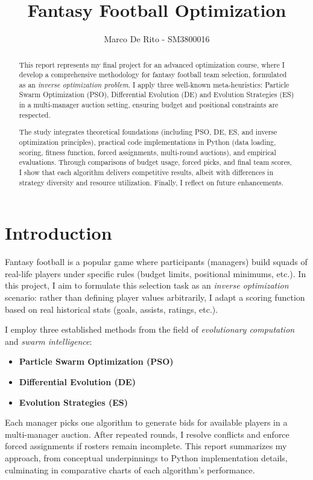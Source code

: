 \documentclass[sigconf]{acmart}
\title{Fantasy Football Optimization}
\author{Marco De Rito - SM3800016}
\affiliation{
	\institution{University of Trieste}
	\city{Trieste}
	\country{Italy}
}
\begin{document}
\sloppy
	\begin{abstract}
This report represents my final project for an advanced optimization course, where I develop a comprehensive methodology for fantasy football team selection, formulated as an \emph{inverse optimization problem}. I apply three well-known meta-heuristics: Particle Swarm Optimization (PSO), Differential Evolution (DE) and Evolution Strategies (ES) in a multi-manager auction setting, ensuring budget and positional constraints are respected.

The study integrates theoretical foundations (including PSO, DE, ES, and inverse optimization principles), practical code implementations in Python (data loading, scoring, fitness function, forced assignments, multi-round auctions), and empirical evaluations. Through comparisons of budget usage, forced picks, and final team scores, I show that each algorithm delivers competitive results, albeit with differences in strategy diversity and resource utilization. Finally, I reflect on future enhancements.
	\end{abstract}
	
	
\maketitle
	
	\section{Introduction}
	Fantasy football is a popular game where participants (managers) build squads of real-life players under specific rules (budget limits, positional minimums, etc.). In this project, I aim to formulate this selection task as an \emph{inverse optimization} scenario: rather than defining player values arbitrarily, I adapt a scoring function based on real historical stats (goals, assists, ratings, etc.).
	
	I employ three established methods from the field of \emph{evolutionary computation} and \emph{swarm intelligence}:
	\begin{itemize}
\item \textbf{Particle Swarm Optimization (PSO)}
\item \textbf{Differential Evolution (DE)}
\item \textbf{Evolution Strategies (ES)}
	\end{itemize}
	Each manager picks one algorithm to generate bids for available players in a multi-manager auction. After repeated rounds, I resolve conflicts and enforce forced assignments if rosters remain incomplete. This report summarizes my approach, from conceptual underpinnings to Python implementation details, culminating in comparative charts of each algorithm’s performance.
	
\end{document}
